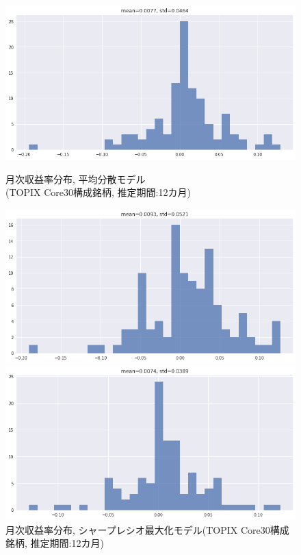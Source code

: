 \documentclass[dvipdfmx,autodetect-engine]{jsarticle}
\begin{document}
\begin{figure}[htbp]
\begin{minipage}{0.5\hsize}
\begin{center}
\includegraphics[width=1.0\hsize]{./figures/mmvp_tpx30_w=12_hist.png}
\end{center}
\caption{\small 月次収益率分布, 平均分散モデル\\(TOPIX Core30構成銘柄, 推定期間:12カ月)}
\label{fig:11}
\end{minipage}
\begin{minipage}{0.5\hsize}
\begin{center}
\includegraphics[width=1.0\hsize]{./figures/srmp_tpx30_w=12_hist.png}
\end{center}
\caption{\small 月次収益率分布, シャープレシオ最大化モデル(TOPIX Core30構成銘柄, 推定期間:12カ月)}
\label{fig:12}
\end{minipage}
\begin{minipage}{0.5\hsize}
\begin{center}
\includegraphics[width=1.0\hsize]{./figures/mmvp_tpx30_w=36_hist.png}

\end{center}
\end{minipage}
\end{figure}
\end{document}
